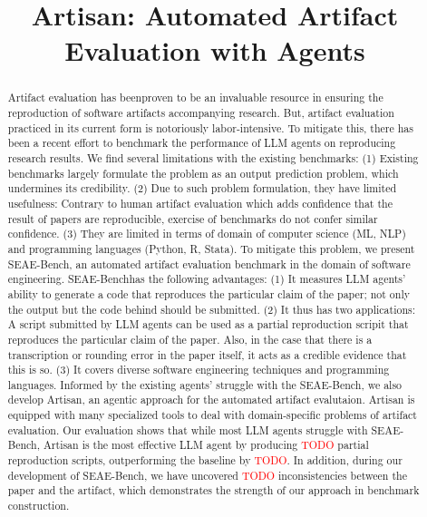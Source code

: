 \documentclass[acmsmall,screen,review,anonymous]{acmart}
\begin{document}
\newcommand\benchmark{SEAE-Bench}

\newcommand\artisanpartial{\textcolor{red}{TODO}}
\newcommand\artisanpartialoutperform{\textcolor{red}{TODO}}
\newcommand\inconsistencies{\textcolor{red}{TODO}}

\title{Artisan: Automated Artifact Evaluation with Agents}
\begin{abstract}
    Artifact evaluation has beenproven to be an invaluable resource in ensuring the reproduction of software artifacts accompanying research.
    But, artifact evaluation practiced in its current form is notoriously labor-intensive.
    To mitigate this, there has been a recent effort to benchmark the performance of LLM agents on reproducing research results.
    We find several limitations with the existing benchmarks:
    (1) Existing benchmarks largely formulate the problem as an output prediction problem, which undermines its credibility.
    (2) Due to such problem formulation, they have limited usefulness: Contrary to human artifact evaluation which adds confidence that the result of papers are reproducible, exercise of benchmarks do not confer similar confidence.
    (3) They are limited in terms of domain of computer science (ML, NLP) and programming languages (Python, R, Stata).
    To mitigate this problem, we present \benchmark, an automated artifact evaluation benchmark in the domain of software engineering.
    \benchmark has the following advantages:
    (1) It measures LLM agents' ability to generate a code that reproduces the particular claim of the paper; not only the output but the code behind should be submitted.
    (2) It thus has two applications: A script submitted by LLM agents can be used as a partial reproduction scripit that reproduces the particular claim of the paper. Also, in the case that there is a transcription or rounding error in the paper itself, it acts as a credible evidence that this is so.
    (3) It covers diverse software engineering techniques and programming languages.
    Informed by the existing agents' struggle with the \benchmark, we also develop Artisan, an agentic approach for the automated artifact evalutaion.
    Artisan is equipped with many specialized tools to deal with domain-specific problems of artifact evaluation.
    Our evaluation shows that while most LLM agents struggle with \benchmark, Artisan is the most effective LLM agent by producing \artisanpartial{} partial reproduction scripts, outperforming the baseline by \artisanpartialoutperform{}.
    In addition, during our development of \benchmark, we have uncovered \inconsistencies{} inconsistencies between the paper and the artifact, which demonstrates the strength of our approach in benchmark construction.
\end{abstract}
\maketitle










\end{document}
